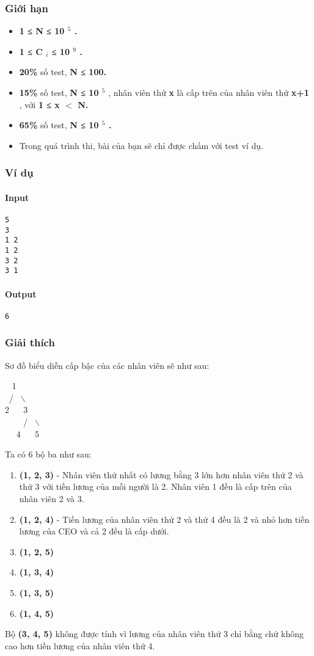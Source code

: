 \subsubsection{Giới hạn}
\begin{itemize}
	\item \textbf{1 ≤ N ≤ 10 $^ 5 $ . }
	\item \textbf{1 ≤ C $_ i $ ≤ 10 $^ 9 $ . }
	\item \textbf{20\% } số test, \textbf{ N ≤ 100. }
	\item \textbf{15\% } số test, \textbf{ N ≤ 10 $^ 5 $} , nhân viên thứ \textbf{ x } là cấp trên của nhân viên thứ \textbf{ x+1 } , với \textbf{ 1 ≤ x $<$ N. }
	\item \textbf{65\% } số test, \textbf{ N ≤ 10 $^ 5 $ . }
	\item Trong quá trình thi, bài của bạn sẽ chỉ được chấm với test ví dụ.
\end{itemize}

\subsubsection{Ví dụ}

\paragraph{Input}
\begin{verbatim}
5
3
1 2
1 2
3 2
3 1\end{verbatim}

\paragraph{Output}
\begin{verbatim}
6\end{verbatim}

\subsubsection{Giải thích}

Sơ đồ biểu diễn cấp bậc của các nhân viên sẽ như sau:

  1
\\ /  $\backslash$
\\2    3
\\     /  $\backslash$
\\   4    5

Ta có 6 bộ ba như sau:
\begin{enumerate}
	\item \textbf{(1, 2, 3) } - Nhân viên thứ nhất có lương bằng 3 lớn hơn nhân viên thứ 2 và thứ 3 với tiền lương của mỗi người là 2. Nhân viên 1 đều là cấp trên của nhân viên 2 và 3.
	\item \textbf{(1, 2, 4) } - Tiền lương của nhân viên thứ 2 và thứ 4 đều là 2 và nhỏ hơn tiền lương của CEO và cả 2 đều là cấp dưới.
	\item \textbf{(1, 2, 5) }
	\item \textbf{(1, 3, 4) }
	\item \textbf{(1, 3, 5) }
	\item \textbf{(1, 4, 5) }
\end{enumerate}

Bộ \textbf{ (3, 4, 5) } không được tính vì lương của nhân viên thứ 3 chỉ bằng chứ không cao hơn tiền lương của nhân viên thứ 4.